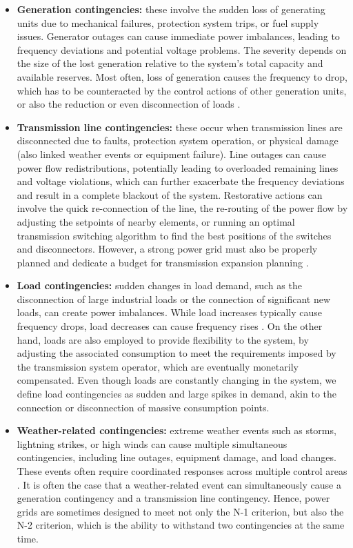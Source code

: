 \documentclass{article}
\begin{document}
\begin{itemize}

\item \textbf{Generation contingencies:} these involve the sudden loss of generating units due to mechanical failures, protection system trips, or fuel supply issues. Generator outages can cause immediate power imbalances, leading to frequency deviations and potential voltage problems. The severity depends on the size of the lost generation relative to the system's total capacity and available reserves. Most often, loss of generation causes the frequency to drop, which has to be counteracted by the control actions of other generation units, or also the reduction or even disconnection of loads \cite{marzband2016adaptive}. 

\item \textbf{Transmission line contingencies:} these occur when transmission lines are disconnected due to faults, protection system operation, or physical damage (also linked weather events or equipment failure). Line outages can cause power flow redistributions, potentially leading to overloaded remaining lines and voltage violations, which can further exacerbate the frequency deviations and result in a complete blackout of the system. Restorative actions can involve the quick re-connection of the line, the re-routing of the power flow by adjusting the setpoints of nearby elements, or running an optimal transmission switching algorithm to find the best positions of the switches and disconnectors. However, a strong power grid must also be properly planned and dedicate a budget for transmission expansion planning \cite{aeggegn2020load}. 

\item \textbf{Load contingencies:} sudden changes in load demand, such as the disconnection of large industrial loads or the connection of significant new loads, can create power imbalances. While load increases typically cause frequency drops, load decreases can cause frequency rises \cite{contingency:load}. On the other hand, loads are also employed to provide flexibility to the system, by adjusting the associated consumption to meet the requirements imposed by the transmission system operator, which are eventually monetarily compensated. Even though loads are constantly changing in the system, we define load contingencies as sudden and large spikes in demand, akin to the connection or disconnection of massive consumption points.

\item \textbf{Weather-related contingencies:} extreme weather events such as storms, lightning strikes, or high winds can cause multiple simultaneous contingencies, including line outages, equipment damage, and load changes. These events often require coordinated responses across multiple control areas \cite{contingency:weather}. It is often the case that a weather-related event can simultaneously cause a generation contingency and a transmission line contingency. Hence, power grids are sometimes designed to meet not only the N-1 criterion, but also the N-2 criterion, which is the ability to withstand two contingencies at the same time.


\end{itemize}
\end{document}
